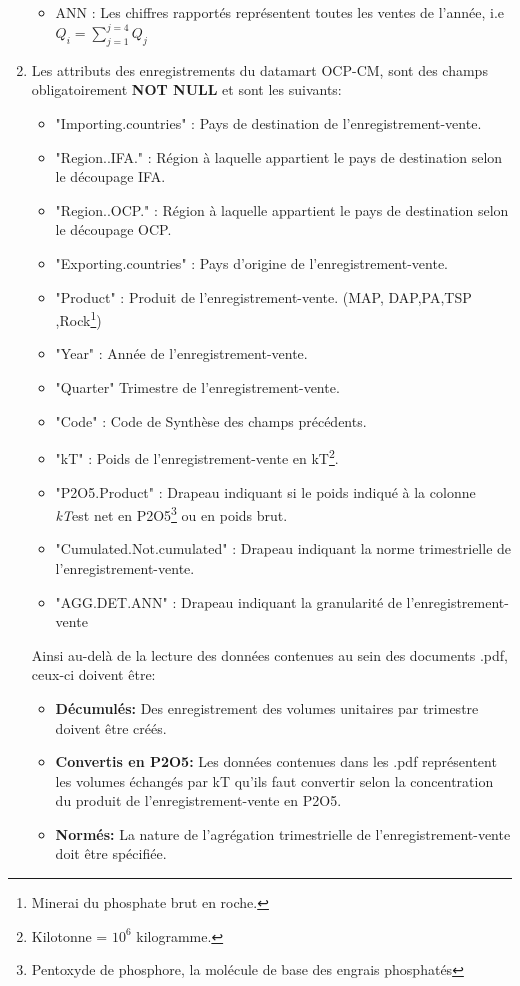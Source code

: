 \begin{enumerate}
\begin{itemize}
		\item ANN : Les chiffres rapportés représentent toutes les ventes de l'année, i.e ${Q_i = \sum_{j=1}^{j=4} Q_j}$
		\end{itemize}
	\item Les attributs des enregistrements du datamart OCP-CM, sont des champs obligatoirement \textbf{NOT NULL} et sont les suivants:
	\begin{itemize}
	\item "Importing.countries" : Pays de destination de l'enregistrement-vente.
	\item "Region..IFA." : Région à laquelle appartient le pays de destination selon le découpage IFA.
	\item "Region..OCP." : Région à laquelle appartient le pays de destination selon le découpage OCP.
	\item "Exporting.countries" : Pays d'origine de l'enregistrement-vente.
	\item "Product" : Produit de l'enregistrement-vente. (MAP, DAP,PA,TSP ,Rock\footnote{Minerai du phosphate brut en roche.})
	\item "Year" : Année de l'enregistrement-vente.
	\item "Quarter" Trimestre de l'enregistrement-vente.
	\item "Code" : Code de Synthèse des champs précédents.
	\item "kT" :  Poids de l'enregistrement-vente en kT\footnote{Kilotonne = $10^6$ kilogramme.}.           
	\item "P2O5.Product" : Drapeau indiquant si le poids indiqué à la colonne \textit{kT}est net en P2O5\footnote{Pentoxyde de phosphore, la molécule de base des engrais phosphatés} ou en poids brut.
	\item "Cumulated.Not.cumulated" : Drapeau indiquant la norme trimestrielle de l'enregistrement-vente.
	\item "AGG.DET.ANN" : Drapeau indiquant la granularité de l'enregistrement-vente
	\end{itemize}
		Ainsi au-delà de la lecture des données contenues au sein des documents .pdf, ceux-ci doivent être:
		\begin{itemize}
		\item \textbf{Décumulés:} Des enregistrement des volumes unitaires par trimestre doivent être créés.
		\item \textbf{Convertis en P2O5:} Les données contenues dans les .pdf représentent les volumes échangés par kT qu'ils faut convertir selon la concentration du produit de l'enregistrement-vente en P2O5.
		\item \textbf{Normés:} La nature de l'agrégation trimestrielle de l'enregistrement-vente doit être spécifiée.
		\end{itemize}
	\end{enumerate}
